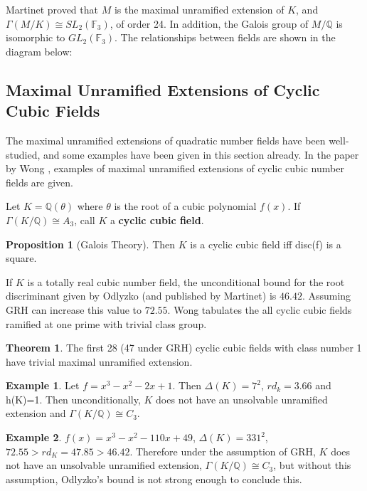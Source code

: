 \documentclass[12pt]{extarticle}
\newcommand{\Q}{\mathbb{Q}}
\newcommand{\<}{\langle}
\renewcommand{\>}{\rangle}
\theoremstyle{definition}
\newtheorem{theorem}{Theorem}
\newtheorem{proposition}{Proposition}
\newtheorem{example}{Example}
\begin{document}
Martinet proved that $M$ is the maximal unramified extension of $K$, and $\Gamma(M/K) \cong SL_2(\mathbb{F}_3)$, of order 24. In addition, the Galois group of $M/\Q$ is isomorphic to $GL_2(\mathbb{F}_3)$. The relationships between fields are shown in the diagram below:
\begin{center}
\end{center}


\subsection{Maximal Unramified Extensions of Cyclic Cubic Fields}
The maximal unramified extensions of quadratic number fields have been well-studied, and some examples have been given in this section already. In the paper by Wong \cite{WONG}, examples of maximal unramified extensions of cyclic cubic number fields are given.\par

Let $K=\Q(\theta)$ where $\theta$ is the root of a cubic polynomial $f(x)$. If $\Gamma(K/\Q) \cong A_3$, call $K$ a \textbf{cyclic cubic field}.
\begin{proposition}[Galois Theory]
Then $K$ is a cyclic cubic field iff disc(f) is a square. 

\end{proposition} If $K$ is a totally real cubic number field, the unconditional bound for the root discriminant given by Odlyzko (and published by Martinet) is $46.42$. Assuming GRH can increase this value to $72.55$. Wong \cite{WONG} tabulates the all cyclic cubic fields ramified at one prime with trivial class group. 
\begin{theorem}
The first 28 (47 under GRH) cyclic cubic fields with class number 1 have trivial maximal unramified extension.
\end{theorem}
\begin{example}
    Let $f=x^3-x^2-2x+1$. Then $\Delta(K)=7^2$, $rd_{k}=3.66$ and h(K)=1. Then unconditionally, $K$ does not have an unsolvable unramified extension and $\Gamma(K/\Q)\cong C_3$.
\end{example}
\begin{example}
    $f(x)=x^3 -x^2 -110x +49$, $\Delta(K)=331^2$, $72.55 > rd_{K}=47.85 > 46.42$. Therefore under the assumption of GRH, $K$ does not have an unsolvable unramified extension, $\Gamma(K/\Q)\cong C_3$, but without this assumption, Odlyzko's bound is not strong enough to conclude this.
\end{example}
\end{document}
